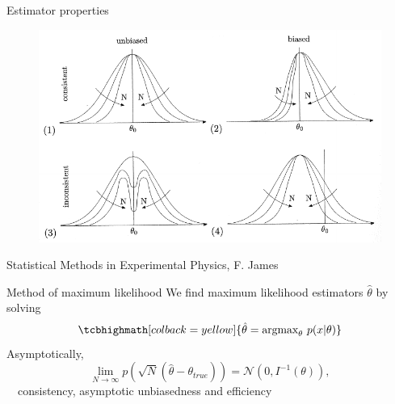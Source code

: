 \documentclass[
aspectratio=169,
14pt,
professionalfonts
]{beamer}
\newcommand{\arrow}{~\ding{220}~}
\begin{document}
\begin{frame}{Estimator properties}
    \vspace{-0.5cm}
    \begin{figure}
    \centering
    \includegraphics[width=0.75\linewidth]{../plots/estimator.pdf}
\end{figure}
\begin{flushright}
    \small
    Statistical Methods in Experimental Physics, F. James
\end{flushright}
\end{frame}

\begin{frame}{Method of maximum likelihood}
    \vspace{-0.2cm}
    We find maximum likelihood estimators $ \hat \theta$ by solving
    $$
    \tcbhighmath[colback=yellow]{
        \hat \theta = \text{argmax}_\theta ~ p(x|\theta)
    }
    $$
    Asymptotically,
    $$
    \lim_{N \to \infty} p\left(\sqrt{N}(\hat \theta - \theta_{true})\right) = \mathcal{N}\left(0, I^{-1}(\theta)\right),
    $$
    \arrow consistency, asymptotic unbiasedness and efficiency
\end{frame}

\end{document}
